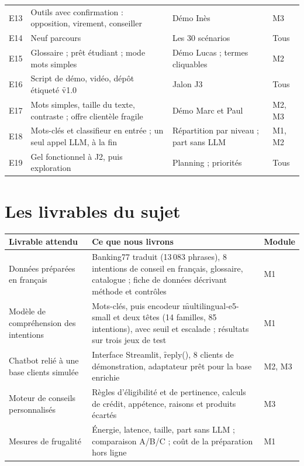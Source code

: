 \begin{center}
\begin{longtable}{@{}l L{4.6cm} L{4.6cm} l@{}}
E13 & Outils avec confirmation : opposition, virement, conseiller & Démo Inès & M3 \\
E14 & Neuf parcours & Les 30 scénarios & Tous \\
E15 & Glossaire ; prêt étudiant ; mode mots simples & Démo Lucas ; termes cliquables & M2 \\
E16 & Script de démo, vidéo, dépôt étiqueté \f{v1.0} & Jalon J3 & Tous \\
E17 & Mots simples, taille du texte, contraste ; offre clientèle fragile & Démo Marc et Paul &
  M2, M3 \\
E18 & Mots-clés et classifieur en entrée ; un seul appel LLM, à la fin & Répartition par
  niveau ; part sans LLM & M1, M2 \\
E19 & Gel fonctionnel à J2, puis exploration & Planning ; priorités & Tous \\
\bottomrule
\end{longtable}
\end{center}

\section{Les livrables du sujet}

\begin{center}\small
\begin{tabularx}{\textwidth}{@{}L{4.2cm} Y l@{}}
\toprule
\textbf{Livrable attendu} & \textbf{Ce que nous livrons} & \textbf{Module} \\
\midrule
Données préparées en français & Banking77 traduit (13\,083 phrases), 8 intentions de conseil en
  français, glossaire, catalogue ; fiche de données décrivant méthode et contrôles & M1 \\
Modèle de compréhension des intentions & Mots-clés, puis encodeur \f{multilingual-e5-small} et
  deux têtes
  (14 familles, 85 intentions), avec seuil et escalade ; résultats sur trois jeux de test & M1 \\
Chatbot relié à une base clients simulée & Interface Streamlit, \f{reply()}, 8 clients de
  démonstration, adaptateur prêt pour la base enrichie & M2, M3 \\
Moteur de conseils personnalisés & Règles d'éligibilité et de pertinence, calculs de crédit,
  appétence, raisons et produits écartés & M3 \\
Mesures de frugalité & Énergie, latence, taille, part sans LLM ; comparaison A/B/C ; coût de
  la préparation hors ligne & M1 \\
\bottomrule
\end{tabularx}
\end{center}

